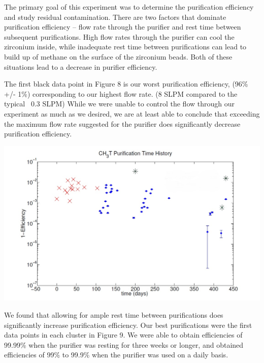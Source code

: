 \documentclass[a4paper,12pt]{article}
\begin{document}
The primary goal of this experiment was to determine the purification efficiency and study residual contamination.  There are two factors that dominate purification efficiency -- flow rate through the purifier and rest time between subsequent purifications.  High flow rates through the purifier can cool the zirconium inside, while inadequate rest time between purifications can lead to build up of methane on the surface of the zirconium beads.  Both of these situations lead to a decrease in purifier efficiency. 

The first black data point in Figure 8 is our worst purification efficiency, (96\% +/- 1\%) corresponding to our highest flow rate. (8 SLPM compared to the typical ~0.3 SLPM)  While we were unable to control the flow through our experiment as much as we desired, we are at least able to conclude that exceeding the maximum flow rate suggested for the purifier does significantly decrease purification efficiency.

\begin{center}
\includegraphics[scale=0.4]{Figone.jpg}
\end{center}

We found that allowing for ample rest time between purifications does significantly increase purification efficiency. Our best purifications were the first data points in each cluster in Figure 9.  We were able to obtain efficiencies of 99.99\% when the purifier was resting for three weeks or longer, and obtained efficiencies of 99\% to 99.9\% when the purifier was used on a daily basis.
\end{document}
